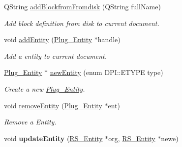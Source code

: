 \begin{DoxyCompactItemize}
Q\-String \hyperlink{classDoc__plugin__interface_ac12200c940042a7576bb49403ada5fe4}{add\-Blockfrom\-Fromdisk} (Q\-String full\-Name)
\begin{DoxyCompactList}\small\item\em Add block definition from disk to current document. \end{DoxyCompactList}\item 
void \hyperlink{classDoc__plugin__interface_a9a4fb2c9c66199b3de81e4b8b94ee424}{add\-Entity} (\hyperlink{classPlug__Entity}{Plug\-\_\-\-Entity} $\ast$handle)
\begin{DoxyCompactList}\small\item\em Add a entity to current document. \end{DoxyCompactList}\item 
\hyperlink{classPlug__Entity}{Plug\-\_\-\-Entity} $\ast$ \hyperlink{classDoc__plugin__interface_a73cf463855eaf206804b84ed12afaa5d}{new\-Entity} (enum D\-P\-I\-::\-E\-T\-Y\-P\-E type)
\begin{DoxyCompactList}\small\item\em Create a new \hyperlink{classPlug__Entity}{Plug\-\_\-\-Entity}. \end{DoxyCompactList}\item 
void \hyperlink{classDoc__plugin__interface_a4c274705905b68aac6975e488487243d}{remove\-Entity} (\hyperlink{classPlug__Entity}{Plug\-\_\-\-Entity} $\ast$ent)
\begin{DoxyCompactList}\small\item\em Remove a Entity. \end{DoxyCompactList}\item 
\hypertarget{classDoc__plugin__interface_a0b1fda6cb91579998125a697377b6f76}{void {\bfseries update\-Entity} (\hyperlink{classRS__Entity}{R\-S\-\_\-\-Entity} $\ast$org, \hyperlink{classRS__Entity}{R\-S\-\_\-\-Entity} $\ast$newe)}\label{classDoc__plugin__interface_a0b1fda6cb91579998125a697377b6f76}


\end{DoxyCompactItemize}
